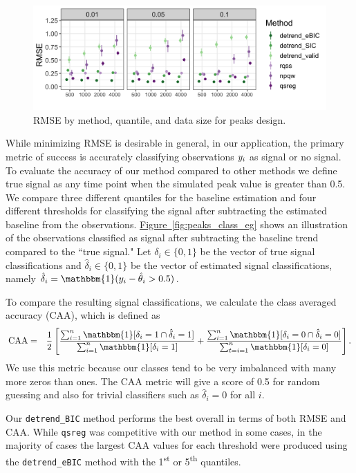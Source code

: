 \documentclass[12pt]{article}
\newcommand{\Fig}[1]{\hyperref[fig:#1]{Figure~\ref*{fig:#1}}} %
\newcommand{\Fig}[1]{{Figure~\ref{fig:#1}}} %
\newcommand{\One}{\mathbbm{1}}
\newcommand{\VE}[2]{\MakeLowercase{#1}_{#2}} %
\begin{document}
	\begin{figure}
		\includegraphics[width = \linewidth]{Figures/peaks_mse.png}
		\caption{RMSE by method, quantile, and data size for peaks design.}
		\label{fig:peaks_rmse}
	\end{figure}

	While minimizing RMSE is desirable in general, in our application, the primary metric of success is accurately classifying observations $\VE{y}{i}$ as signal or no signal. To evaluate the accuracy of our method compared to other methods we define true signal as any time point when the simulated peak value is greater than 0.5. We compare three different quantiles for the baseline estimation and four different thresholds for classifying the signal after subtracting the estimated baseline from the observations.  \Fig{peaks_class_eg} shows an illustration of the observations classified as signal after subtracting the baseline trend compared to the ``true signal." Let $\delta_i \in \{0,1\}$ be the vector of true signal classifications and $\hat{\delta}_i \in \{0,1\}$ be the vector of estimated signal classifications, namely $\hat{\delta}_i = \One(\VE{y}{i} - \hat{\theta}_{i} > 0.5)$.


	To compare the resulting signal classifications, we calculate the class averaged accuracy (CAA), which is defined as
	\begin{eqnarray*}
	\mbox{CAA} & = & \frac{1}{2}\left[\frac{\sum_{i=1}^n \One[\delta_i = 1 \cap \hat{\delta}_i = 1]}{\sum_{i=1}^n \One[\delta_i = 1]} + \frac{\sum_{i=1}^n \One[\delta_i = 0 \cap \hat{\delta}_i=0]}{\sum_{t=i=1}^n \One[\delta_i = 0]}\right].
	\end{eqnarray*}
	We use this metric because our classes tend to be very imbalanced with many more zeros than ones. The CAA metric will give a score of 0.5 for random guessing and also for trivial classifiers such as $\hat{\delta}_i = 0$ for all $i$.

	Our \texttt{detrend\_BIC} method performs the best overall in terms of both RMSE and CAA. While \texttt{qsreg} was competitive with our method in some cases, in the majority of cases the largest CAA values for each threshold were produced using the \texttt{detrend\_eBIC} method with the 1\textsuperscript{st} or 5\textsuperscript{th} quantiles.
\end{document}
